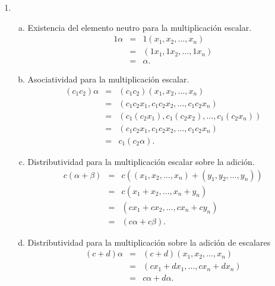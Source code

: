 \begin{enumerate}[\bfseries 1.]
\begin{enumerate}[(1)]
\begin{enumerate}[(a)]
		\end{enumerate}

	    \item 
		\begin{enumerate}[(a)]
		    \item Existencia del elemento neutro para la multiplicación escalar.
			$$
			\begin{array}{rcl}
			    1\alpha & = & 1(x_1,x_2,\ldots,x_n)\\
			    & = & (1x_1,1x_2,\ldots,1x_n)\\
			    & = & \alpha.
			\end{array}
			$$
		    \item Asociatividad para la multiplicación escalar.\\
			$$
			\begin{array}{rcl}
			    (c_1c_2)\alpha & = & (c_1c_2)(x_1,x_2,\ldots,x_n)\\
			    & = & (c_1c_2x_1,c_1c_2x_2,\ldots,c_1c_2x_n)\\
			    & = & (c_1(c_2x_1),c_1(c_2x_2),\ldots,c_1(c_2x_n))\\
			    & = & (c_1c_2x_1,c_1c_2x_2,\ldots,c_1c_2x_n)\\
			    & = & c_1(c_2\alpha).
			\end{array}
			$$

		    \item Distributividad para la multiplicación escalar sobre la adición.
			$$
			\begin{array}{rcl}
			    c(\alpha+\beta) & = & c((x_1,x_2,\ldots,x_n)+(y_1,y_2,\ldots, y_n))\\
			    & = & c(x_1+x_2,\ldots,x_n+y_n)\\
			    & = & (cx_1+cx_2,\ldots,cx_n+cy_n)\\
			    & = & (c\alpha+c\beta).
			\end{array}
			$$

		    \item Distributividad para la multiplicación sobre la adición de escalares
			$$
			\begin{array}{rcl}
			    (c+d)\alpha & = & (c+d)(x_1,x_2,\ldots,x_n)\\
			    & = & (cx_1+dx_1,\ldots,cx_n+dx_n)\\
			    & = & c\alpha+d\alpha.
			\end{array}
			$$

		\end{enumerate}
		\vspace{.5cm}


\end{enumerate}
\end{enumerate}
